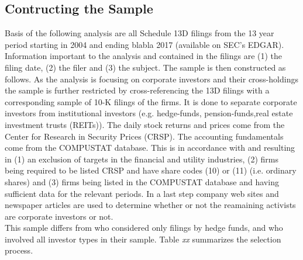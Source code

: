 \documentclass[12pt]{article}
\begin{document}
\subsection{Contructing the Sample}
Basis of the following analysis are all Schedule 13D filings from the 13 year period starting in 2004 and ending blabla 2017 (available on SEC's EDGAR).
Information important to the analysis and contained in the filings are (1) the filing date, (2) the filer and (3) the subject. The sample is then constructed as follows. As the analysis is focusing on corporate investors and their cross-holdings the sample is further restricted by cross-referencing the 13D filings with a corresponding sample of 10-K filings of the firms. It is done to separate corporate investors from institutional investors (e.g. hedge-funds, pension-funds,real estate investment trusts (REITs)). 
The daily stock returns and prices come from the Center for Research in Security Prices (CRSP). The accounting fundamentals come from the COMPUSTAT database. This is in accordance with \citet{Fama2006} and \citet{Brigida2012} resulting in (1) an exclusion of targets in the financial and utility industries, (2) firms being required to be listed CRSP and have share codes (10) or (11) (i.e. ordinary shares) and (3)  firms being listed in the COMPUSTAT database and having sufficient data for the relevant periods. In a last step company web sites and newspaper articles are used to determine whether or not the reamaining activists are corporate investors or not.\\
This sample differs from \citet{Brav2008} who considered only filings by hedge funds, and \citet{Collin-Dufresne2015} who involved all investor types in their sample. Table \emph{xx} summarizes the selection process. %
\end{document}
